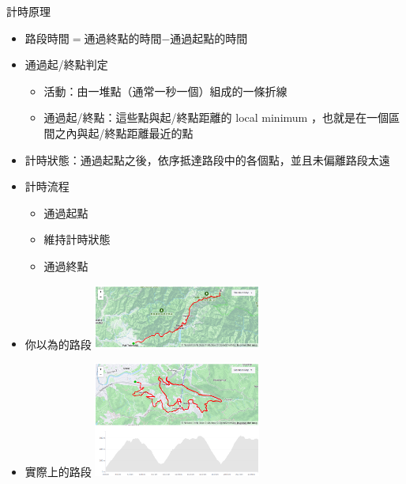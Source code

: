 \begin{frame}{計時原理}
\begin{multicols}{2}
\begin{itemize}
\item 路段時間$=$通過終點的時間$-$通過起點的時間\pause
\item 通過起/終點判定
\begin{itemize}
\item 活動：由一堆點（通常一秒一個）組成的一條折線
\item 通過起/終點：這些點與起/終點距離的 local minimum ，也就是在一個區間之內與起/終點距離最近的點
\end{itemize}\pause
\item 計時狀態：通過起點之後，依序抵達路段中的各個點，並且未偏離路段太遠\pause
\item 計時流程
\begin{itemize}
\item 通過起點
\item 維持計時狀態
\item 通過終點
\end{itemize}
\newpage
\pause
\item 你以為的路段
\includegraphics[width=5.5cm]{wulingMap.png}\pause
\item 實際上的路段
\includegraphics[width=5.5cm]{maokong3pMap.png}
\end{itemize}
\end{multicols}
\end{frame}

\newcommand{\yes}[1]{\alt<2>{\textcolor{red}{#1}}{\textcolor{black}{#1}}}
\newcommand{\maybe}[1]{\alt<2>{\textcolor{orange}{#1}}{\textcolor{black}{#1}}}

